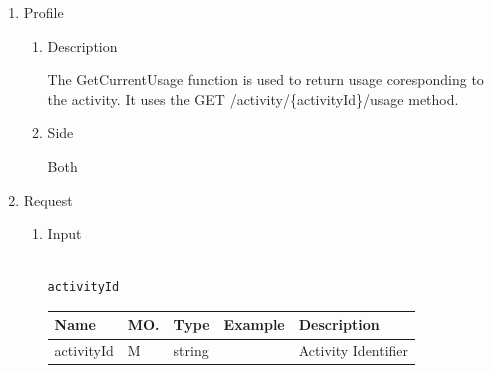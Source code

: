 \newpage



\begin{enumerate}

\item Profile

\begin{enumerate}

\item Description

The GetCurrentUsage function is used to return usage coresponding to the activity.  
It uses the GET /activity/\{activityId\}/usage method. 

\item Side

Both

\end{enumerate}

\item Request

\begin{enumerate}

\item Input

\begin{tcolorbox}[boxrule=0pt, frame empty]
\begin{verbatim}

activityId

\end{verbatim}
\end{tcolorbox}





\begin{table}[H]
\footnotesize

\begin{center}
\begin{tabular}{|p{3cm}|l|p{3cm}|p{3cm}|p{4cm}|} 
\hline
\rowcolor{lightgray}	Name	& MO.	& Type	& Example & 	Description \\
\hline

activityId				& M	& 	string				&								&	Activity Identifier \\ 
\hline


\end{tabular}
\end{center}
\end{table}
\end{enumerate}
\end{enumerate}
